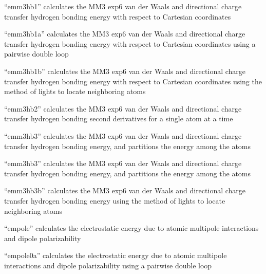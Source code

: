\documentclass[letterpaper,11pt,english]{sphinxmanual}
\begin{document}

“emm3hb1” calculates the MM3 exp\sphinxhyphen{}6 van der Waals and directional charge transfer hydrogen bonding energy with respect to Cartesian coordinates


“emm3hb1a” calculates the MM3 exp\sphinxhyphen{}6 van der Waals and directional charge transfer hydrogen bonding energy with respect to Cartesian coordinates using a pairwise double loop


“emm3hb1b” calculates the MM3 exp\sphinxhyphen{}6 van der Waals and directional charge transfer hydrogen bonding energy with respect to Cartesian coordinates using the method of lights to locate neighboring atoms


“emm3hb2” calculates the MM3 exp\sphinxhyphen{}6 van der Waals and directional charge transfer hydrogen bonding second derivatives for a single atom at a time


“emm3hb3” calculates the MM3 exp\sphinxhyphen{}6 van der Waals and directional charge transfer hydrogen bonding energy, and partitions the energy among the atoms


“emm3hb3” calculates the MM3 exp\sphinxhyphen{}6 van der Waals and directional charge transfer hydrogen bonding energy, and partitions the energy among the atoms


“emm3hb3b” calculates the MM3 exp\sphinxhyphen{}6 van der Waals and directional charge transfer hydrogen bonding energy using the method of lights to locate neighboring atoms


“empole” calculates the electrostatic energy due to atomic multipole interactions and dipole polarizability


“empole0a” calculates the electrostatic energy due to atomic multipole interactions and dipole polarizability using a pairwise double loop

\end{document}
